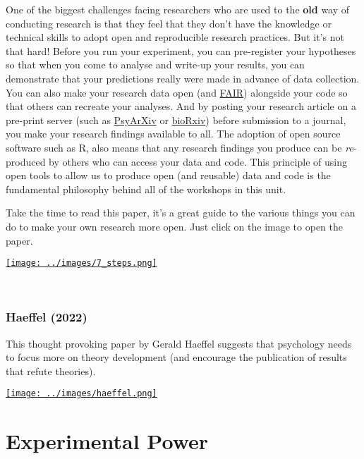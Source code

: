 \documentclass[
]{book}
\begin{document}
One of the biggest challenges facing researchers who are used to the \textbf{old} way of conducting research is that they feel that they don't have the knowledge or technical skills to adopt open and reproducible research practices. But it's not that hard! Before you run your experiment, you can pre-register your hypotheses so that when you come to analyse and write-up your results, you can demonstrate that your predictions really were made in advance of data collection. You can also make your research data open (and \href{https://www.nature.com/articles/sdata201618}{FAIR}) alongside your code so that others can recreate your analyses. And by posting your research article on a pre-print server (such as \href{https://psyarxiv.com}{PsyArXiv} or \href{https://www.biorxiv.org}{bioRxiv}) before submission to a journal, you make your research findings available to all. The adoption of open source software such as R, also means that any research findings you produce can be \emph{re}-produced by others who can access your data and code. This principle of using open tools to allow us to produce open (and reusable) data and code is the fundamental philosophy behind all of the workshops in this unit.

Take the time to read this paper, it's a great guide to the various things you can do to make your own research more open. Just click on the image to open the paper.

\href{https://psycnet.apa.org/fulltext/2019-80290-002.pdf}{\texttt{[image: ../images/7\_steps.png]}}

~~

\hypertarget{haeffel-2022}{%
\subsubsection*{Haeffel (2022)}\label{haeffel-2022}}

This thought provoking paper by Gerald Haeffel suggests that psychology needs to focus more on theory development (and encourage the publication of results that refute theories).

\href{https://royalsocietypublishing.org/doi/10.1098/rsos.220099}{\texttt{[image: ../images/haeffel.png]}}

\hypertarget{experimental-power}{%
\section{Experimental Power}\label{experimental-power}}
\end{document}
